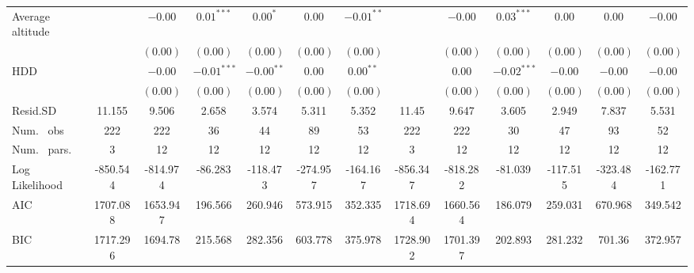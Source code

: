 \begin{table}
\begin{center}
\begin{tabular}{l c c c c c c c c c c c c}
Average altitude                  &               & $-0.00$       & $0.01^{***}$  & $0.00^{*}$     & $0.00$        & $-0.01^{**}$  &               & $-0.00$       & $0.03^{***}$  & $0.00$         & $0.00$        & $-0.00$       \\
                                  &               & $(0.00)$      & $(0.00)$      & $(0.00)$       & $(0.00)$      & $(0.00)$      &               & $(0.00)$      & $(0.00)$      & $(0.00)$       & $(0.00)$      & $(0.00)$      \\
HDD                               &               & $-0.00$       & $-0.01^{***}$ & $-0.00^{**}$   & $0.00$        & $0.00^{**}$   &               & $0.00$        & $-0.02^{***}$ & $-0.00$        & $-0.00$       & $-0.00$       \\
                                  &               & $(0.00)$      & $(0.00)$      & $(0.00)$       & $(0.00)$      & $(0.00)$      &               & $(0.00)$      & $(0.00)$      & $(0.00)$       & $(0.00)$      & $(0.00)$      \\
\hline
Resid.SD                          & 11.155        & 9.506         & 2.658         & 3.574          & 5.311         & 5.352         & 11.45         & 9.647         & 3.605         & 2.949          & 7.837         & 5.531         \\
Num. \ obs                        & 222           & 222           & 36            & 44             & 89            & 53            & 222           & 222           & 30            & 47             & 93            & 52            \\
Num. \ pars.                      & 3             & 12            & 12            & 12             & 12            & 12            & 3             & 12            & 12            & 12             & 12            & 12            \\
Log Likelihood                    & -850.544      & -814.974      & -86.283       & -118.473       & -274.957      & -164.167      & -856.347      & -818.282      & -81.039       & -117.515       & -323.484      & -162.771      \\
AIC                               & 1707.088      & 1653.947      & 196.566       & 260.946        & 573.915       & 352.335       & 1718.694      & 1660.564      & 186.079       & 259.031        & 670.968       & 349.542       \\
BIC                               & 1717.296      & 1694.78       & 215.568       & 282.356        & 603.778       & 375.978       & 1728.902      & 1701.397      & 202.893       & 281.232        & 701.36        & 372.957       \\

\end{tabular}
\end{center}
\end{table}
